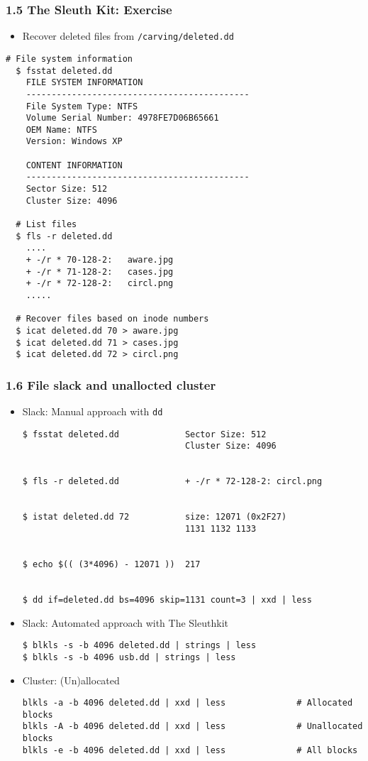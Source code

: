 \begin{frame}[fragile]
  \frametitle{1.5 The Sleuth Kit: Exercise}
    \begin{itemize}
        \item[] Recover deleted files from \texttt{/carving/deleted.dd}
    \end{itemize}
  \begin{lstlisting}[basicstyle=\tiny\ttfamily]
  # File system information
  $ fsstat deleted.dd
	FILE SYSTEM INFORMATION
	--------------------------------------------
	File System Type: NTFS
	Volume Serial Number: 4978FE7D06B65661
	OEM Name: NTFS
	Version: Windows XP

	CONTENT INFORMATION
	--------------------------------------------
	Sector Size: 512
	Cluster Size: 4096

  # List files
  $ fls -r deleted.dd
	....
	+ -/r * 70-128-2:	aware.jpg
	+ -/r * 71-128-2:	cases.jpg
	+ -/r * 72-128-2:	circl.png
	.....

  # Recover files based on inode numbers
  $ icat deleted.dd 70 > aware.jpg
  $ icat deleted.dd 71 > cases.jpg
  $ icat deleted.dd 72 > circl.png
  \end{lstlisting}
\end{frame}


\begin{frame}[fragile]
  \frametitle{1.6 File slack and unallocted cluster}
    \begin{itemize}
	    \item Slack: Manual approach with \texttt{dd}
  \begin{lstlisting}[basicstyle=\tiny]
$ fsstat deleted.dd             Sector Size: 512
                                Cluster Size: 4096


$ fls -r deleted.dd             + -/r * 72-128-2: circl.png


$ istat deleted.dd 72           size: 12071 (0x2F27)
                                1131 1132 1133


$ echo $(( (3*4096) - 12071 ))  217


$ dd if=deleted.dd bs=4096 skip=1131 count=3 | xxd | less 
  \end{lstlisting}
	    \item Slack: Automated approach with The Sleuthkit
  \begin{lstlisting}[basicstyle=\tiny]
$ blkls -s -b 4096 deleted.dd | strings | less
$ blkls -s -b 4096 usb.dd | strings | less
  \end{lstlisting}
	    \item Cluster: (Un)allocated
  \begin{lstlisting}[basicstyle=\tiny]
blkls -a -b 4096 deleted.dd | xxd | less              # Allocated blocks
blkls -A -b 4096 deleted.dd | xxd | less              # Unallocated blocks
blkls -e -b 4096 deleted.dd | xxd | less              # All blocks
  \end{lstlisting}
    \end{itemize}
\end{frame}





